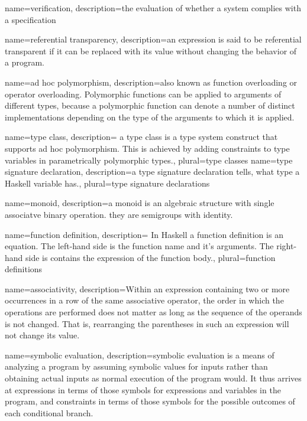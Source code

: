 {
name=verification,
description={the evaluation of whether a system complies with a specification}
}

{
name={referential transparency},
description={an expression is said to be referential transparent if it can be replaced with its value without changing the behavior of a program.}
}

{
name={ad hoc polymorphism},
description={also known as function overloading or operator overloading. Polymorphic functions can be applied to arguments of different types, because a polymorphic function can denote a number of distinct implementations depending on the type of the arguments to which it is applied.}
}

{
name={type class},
description={ a type class is a type system construct that supports ad hoc polymorphism. This is achieved by adding constraints to type variables in parametrically polymorphic types.},
plural={type classes}
}
{
name={type signature declaration},
description={a type signature declaration tells, what type a Haskell variable has.},
plural={type signature declarations}
}

{
name={monoid},
description={a monoid is an algebraic structure with single associatve binary operation. they are semigroups with identity.}
}

{
name={function definition},
description={ In Haskell a function definition is an equation. The left-hand side is the function name and it's arguments. The right-hand side is contains the expression of the function body.},
plural={function definitions}
}

{
name={associativity},
description={Within an expression containing two or more occurrences in a row of the same associative operator, the order in which the operations are performed does not matter as long as the sequence of the operands is not changed. That is, rearranging the parentheses in such an expression will not change its value.}
}

{
name={symbolic evaluation},
description={symbolic evaluation is a means of analyzing a program by assuming symbolic values for inputs rather than obtaining actual inputs as normal execution of the program would. It thus arrives at expressions in terms of those symbols for expressions and variables in the program, and constraints in terms of those symbols for the possible outcomes of each conditional branch.}
}

